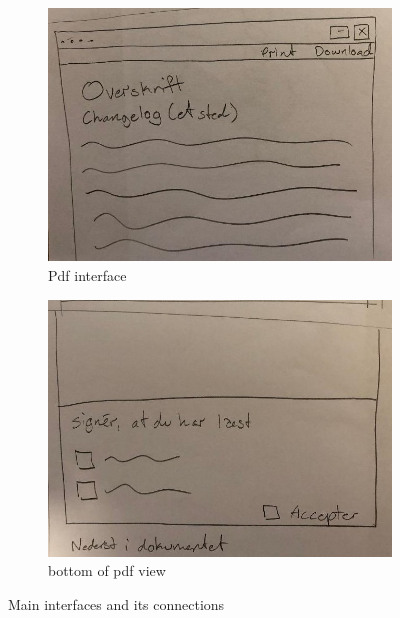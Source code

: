 \begin{figure}[H]\ContinuedFloat
		\centering
		\begin{subfigure}[b]{0.48\textwidth}
			\includegraphics[width=\textwidth]{billeder/pdf-view.jpg}
			\caption{Pdf interface}
			\label{fig:1-pdf}
		\end{subfigure}
		\quad
		\begin{subfigure}[b]{0.48\textwidth}
			\includegraphics[width=\textwidth]{billeder/bottom-pdf-view.jpg}
			\caption{bottom of pdf view}
			\label{fig:1-bottom-pdf}
		\end{subfigure}
		\caption{Main interfaces and its connections}\label{fig:animals}
\end{figure}

